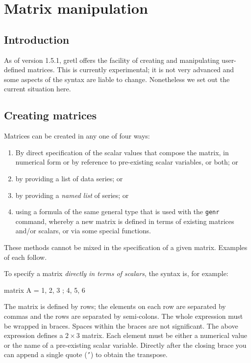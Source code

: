 \chapter{Matrix manipulation}
\label{chap-matrices}

\section{Introduction}
\label{matrix-intro}

As of version 1.5.1, gretl offers the facility of creating and
manipulating user-defined matrices.  This is currently experimental;
it is not very advanced and some aspects of the syntax are liable to
change.  Nonetheless we set out the current situation here.

\section{Creating matrices}
\label{matrix-create}

Matrices can be created in any one of four ways:

\begin{enumerate}
\item By direct specification of the scalar values that compose the
  matrix, in numerical form or by reference to pre-existing
  scalar variables, or both; or
\item by providing a list of data series; or
\item by providing a \textit{named list} of series; or
\item using a formula of the same general type that is used
  with the \texttt{genr} command, whereby a new matrix is defined
  in terms of existing matrices and/or scalars, or via some
  special functions.
\end{enumerate}

These methods cannot be mixed in the specification of a given matrix.
Examples of each follow.

To specify a matrix \textit{directly in terms of scalars}, the syntax
is, for example:

\begin{code}
matrix A = { 1, 2, 3 ; 4, 5, 6 }
\end{code}

The matrix is defined by rows; the elements on each row are separated
by commas and the rows are separated by semi-colons.  The whole
expression must be wrapped in braces.  Spaces within the braces are
not significant.  The above expression defines a $2\times3$ matrix.
Each element must be either a numerical value or the name of a
pre-existing scalar variable.  Directly after the closing brace you
can append a single quote (\texttt{'}) to obtain the transpose.

